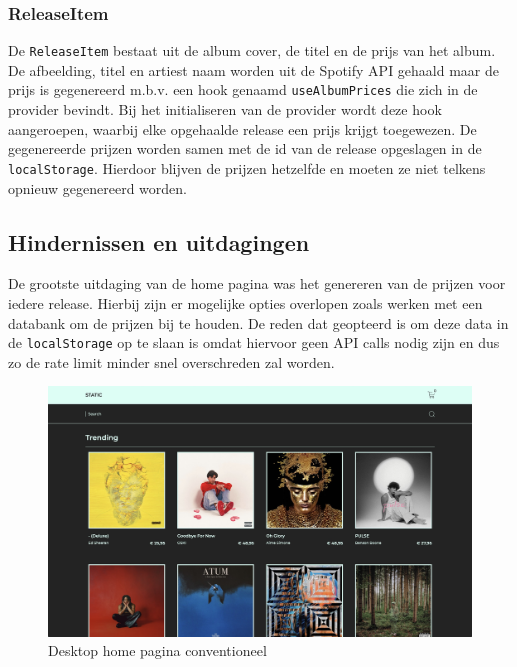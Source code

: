 \subsubsection{ReleaseItem}

De \texttt{ReleaseItem} bestaat uit de album cover, de titel en de prijs van het album. De afbeelding, titel en artiest naam worden uit de Spotify API gehaald maar de prijs is gegenereerd m.b.v. een hook genaamd \texttt{useAlbumPrices} die zich in de provider bevindt. Bij het initialiseren van de provider wordt deze hook aangeroepen, waarbij elke opgehaalde release een prijs krijgt toegewezen. De gegenereerde prijzen worden samen met de id van de release opgeslagen in de \texttt{localStorage}. Hierdoor blijven de prijzen hetzelfde en moeten ze niet telkens opnieuw gegenereerd worden.

\subsection{Hindernissen en uitdagingen}

De grootste uitdaging van de home pagina was het genereren van de prijzen voor iedere release. Hierbij zijn er mogelijke opties overlopen zoals werken met een databank om de prijzen bij te houden. De reden dat geopteerd is om deze data in de \texttt{localStorage} op te slaan is omdat hiervoor geen API calls nodig zijn en dus zo de rate limit minder snel overschreden zal worden.

\begin{figure}
	\centering
	\includegraphics[width=1\linewidth]{graphics/desktopHomeConventioneel}
	\caption[Desktop home pagina conventioneel]{Desktop home pagina conventioneel}
	\label{fig:desktopHomeConventioneel}
\end{figure}

